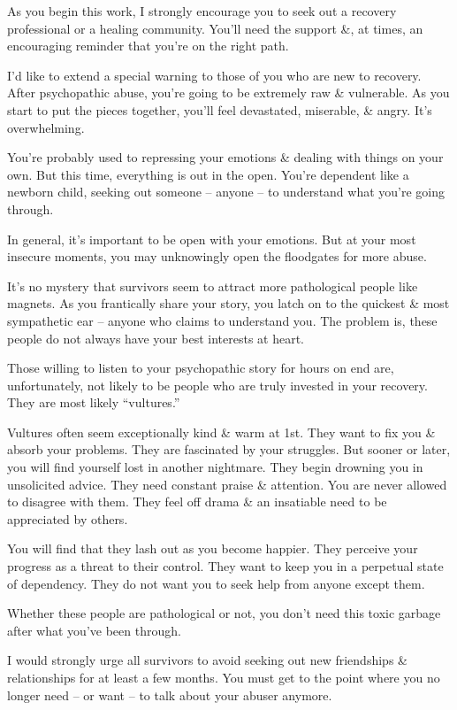\documentclass{article}
\numberwithin{equation}{section}
\begin{document}
As you begin this work, I strongly encourage you to seek out a recovery professional or a healing community. You'll need the support \&, at times, an encouraging reminder that you're on the right path.

I'd like to extend a special warning to those of you who are new to recovery. After psychopathic abuse, you're going to be extremely raw \& vulnerable. As you start to put the pieces together, you'll feel devastated, miserable, \& angry. It's overwhelming.

You're probably used to repressing your emotions \& dealing with things on your own. But this time, everything is out in the open. You're dependent like a newborn child, seeking out someone -- anyone -- to understand what you're going through.

In general, it's important to be open with your emotions. But at your most insecure moments, you may unknowingly open the floodgates for more abuse.

It's no mystery that survivors seem to attract more pathological people like magnets. As you frantically share your story, you latch on to the quickest \& most sympathetic ear -- anyone who claims to understand you. The problem is, these people do not always have your best interests at heart.

Those willing to listen to your psychopathic story for hours on end are, unfortunately, not likely to be people who are truly invested in your recovery. They are most likely ``vultures.''

Vultures often seem exceptionally kind \& warm at 1st. They want to fix you \& absorb your problems. They are fascinated by your struggles. But sooner or later, you will find yourself lost in another nightmare. They begin drowning you in unsolicited advice. They need constant praise \& attention. You are never allowed to disagree with them. They feel off drama \& an insatiable need to be appreciated by others.

You will find that they lash out as you become happier. They perceive your progress as a threat to their control. They want to keep you in a perpetual state of dependency. They do not want you to seek help from anyone except them.

Whether these people are pathological or not, you don't need this toxic garbage after what you've been through.

I would strongly urge all survivors to avoid seeking out new friendships \& relationships for at least a few months. You must get to the point where you no longer need -- or want -- to talk about your abuser anymore.
\end{document}
